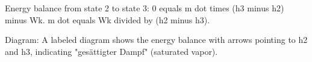 Energy balance from state 2 to state 3:  
0 equals m dot times (h3 minus h2) minus Wk.  
m dot equals Wk divided by (h2 minus h3).  

Diagram:  
A labeled diagram shows the energy balance with arrows pointing to h2 and h3, indicating "gesättigter Dampf" (saturated vapor).